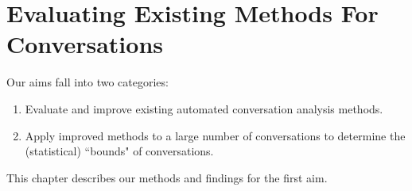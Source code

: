 \chapter{Evaluating Existing Methods For Conversations}
Our aims fall into two categories:
\begin{enumerate}
    \item Evaluate and improve existing automated conversation analysis methods.
    \item Apply improved methods to a large number of conversations to determine the (statistical) ``bounds" of conversations.
\end{enumerate}
This chapter describes our methods and findings for the first aim.



